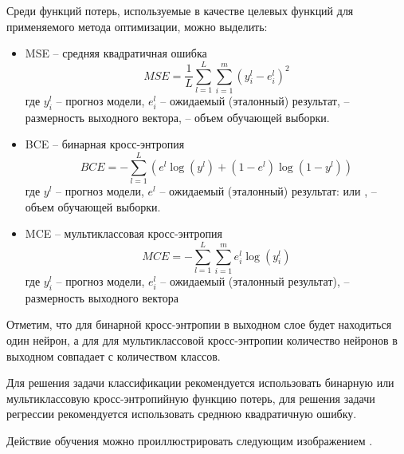 Среди функций потерь, используемые в качестве целевых функций для применяемого метода оптимизации, можно выделить:

\begin{itemize}
	\item MSE -- средняя квадратичная ошибка\\
	\begin{equation*}
		MSE = \frac{1}{L} \sum_{l=1}^L \sum_{i=1}^m (y_i^l - e_i^l)^2
	\end{equation*}
	где $y_i^l$ -- прогноз модели, $e_i^l$ -- ожидаемый (эталонный) результат,  -- размерность выходного вектора,  -- объем обучающей выборки.

	\item BCE -- бинарная кросс-энтропия\\
	\begin{equation*}
		BCE = - \sum_{l=1}^L (e^l \log(y^l) + (1 - e^l)\log(1 - y^l))
	\end{equation*}
	где $y^l$ -- прогноз модели, $e^l$ -- ожидаемый (эталонный) результат:  или ,  -- объем обучающей выборки.
	\item MCE -- мультиклассовая кросс-энтропия\\
	\begin{equation*}
		MCE = - \sum_{l=1}^L \sum_{i=1}^m e_{i}^l \log(y_{i}^l)
	\end{equation*}
	где $y_{i}^l$ -- прогноз модели, $e_i^l$ -- ожидаемый (эталонный результат),  -- размерность выходного вектора
\end{itemize}

Отметим, что для бинарной кросс-энтропии в выходном слое  будет находиться один нейрон, а для для мультиклассовой кросс-энтропии количество нейронов в выходном  совпадает с количеством классов.

Для решения задачи классификации рекомендуется использовать бинарную или мультиклассовую кросс-энтропийную функцию потерь, для решения задачи регрессии рекомендуется использовать среднюю квадратичную ошибку.

Действие обучения  можно проиллюстрировать следующим изображением .


